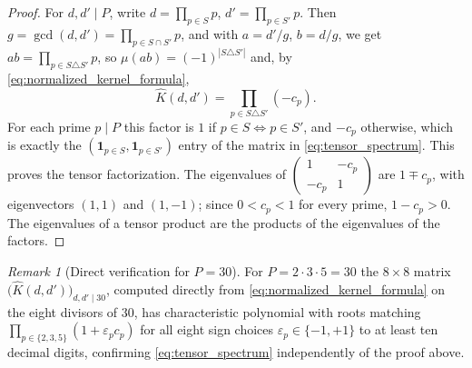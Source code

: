\documentclass[11pt]{amsart}
\numberwithin{equation}{section}
\theoremstyle{plain}
\theoremstyle{definition}
\theoremstyle{remark}
\newtheorem{remark}[theorem]{Remark}
\newcommand{\one}{\mathbf 1}
\newcommand{\epsfun}{\varepsilon}
\newcommand{\mob}{\mu}
\begin{document}
\begin{proof}
For \(d,d'\mid P\), write \(d=\prod_{p\in S}p\), \(d'=\prod_{p\in S'}p\).  Then \(g=\gcd(d,d')=\prod_{p\in S\cap S'}p\), and with \(a=d'/g\), \(b=d/g\), we get \(ab=\prod_{p\in S\triangle S'}p\), so \(\mob(ab)=(-1)^{|S\triangle S'|}\) and, by \eqref{eq:normalized_kernel_formula},
\begin{equation}
\widehat K(d,d')=\prod_{p\in S\triangle S'}(-c_p).
\end{equation}
For each prime \(p\mid P\) this factor is \(1\) if \(p\in S\Leftrightarrow p\in S'\), and \(-c_p\) otherwise, which is exactly the \((\one_{p\in S},\one_{p\in S'})\) entry of the matrix in \eqref{eq:tensor_spectrum}.  This proves the tensor factorization.  The eigenvalues of \(\begin{pmatrix}1&-c_p\\-c_p&1\end{pmatrix}\) are \(1\mp c_p\), with eigenvectors \((1,1)\) and \((1,-1)\); since \(0<c_p<1\) for every prime, \(1-c_p>0\).  The eigenvalues of a tensor product are the products of the eigenvalues of the factors.
\end{proof}

\begin{remark}[Direct verification for \(P=30\)]
\label{rem:tensor_verification}
For \(P=2\cdot3\cdot5=30\) the \(8\times8\) matrix \(\bigl(\widehat K(d,d')\bigr)_{d,d'\mid30}\), computed directly from \eqref{eq:normalized_kernel_formula} on the eight divisors of \(30\), has characteristic polynomial with roots matching \(\prod_{p\in\{2,3,5\}}(1+\epsfun_pc_p)\) for all eight sign choices \(\epsfun_p\in\{-1,+1\}\) to at least ten decimal digits, confirming \eqref{eq:tensor_spectrum} independently of the proof above.
\end{remark}
\end{document}
